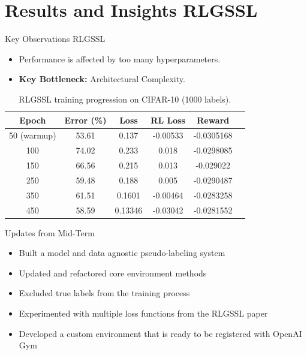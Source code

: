 \documentclass{beamer}
\begin{document}
\section{Results and Insights RLGSSL}
\begin{frame}{Key Observations RLGSSL}
  \begin{itemize}
    \item Performance is affected by too many hyperparameters.
    \item \textbf{Key Bottleneck:} Architectural Complexity.
  \end{itemize}

  \vspace{0.3cm}
  \renewcommand{\arraystretch}{1.3}
  \centering
  \begin{table}[H]
    \centering
    \begin{tabular}{cccccl}
      \hline
      \textbf{Epoch} & \textbf{Error (\%)} & \textbf{Loss} & \textbf{RL Loss} & \textbf{Reward}\\
      \hline
      50 (warmup) & 53.61 & 0.137 & -0.00533 & -0.0305168 \\
      100 & 74.02 & 0.233 & 0.018 & -0.0298085 \\
      150 & 66.56 & 0.215 & 0.013 & -0.029022 \\
      250 & 59.48 & 0.188 & 0.005 & -0.0290487 \\
      350 & 61.51 & 0.1601 & -0.00464 & -0.0283258 \\
      450 & 58.59 & 0.13346 & -0.03042 & -0.0281552\\
      \hline
    \end{tabular}
    \caption{RLGSSL training progression on CIFAR-10 (1000 labels).}
    \label{tab:rlgssl_training}
  \end{table}

\end{frame}


\begin{frame}{Updates from Mid-Term}
  \begin{itemize}
    \item Built a model and data agnostic pseudo-labeling system
    \item Updated and refactored core environment methods
    \item Excluded true labels from the training process
    \item Experimented with multiple loss functions from the RLGSSL paper
    \item Developed a custom environment that is ready to be registered with OpenAI Gym
  \end{itemize}
\end{frame}
\end{document}
